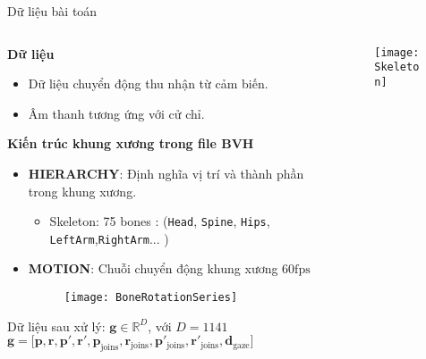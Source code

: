 \begin{frame}{Dữ liệu bài toán}
	
	
	\begin{columns}
		
		\begin{column}{0.7\textwidth}
			
			\textbf{Dữ liệu}
			\begin{itemize}
				\item Dữ liệu chuyển động thu nhận từ cảm biến.
				\item Âm thanh tương ứng với cử chỉ.
			\end{itemize}
			
			\textbf{Kiến trúc khung xương trong file BVH}
			\begin{itemize}
				\item \textbf{HIERARCHY}: Định nghĩa vị trí và thành phần trong khung xương.
				\begin{itemize}
					\item Skeleton: 75 bones : 
					\small{(\texttt{Head}, \texttt{Spine}, \texttt{Hips}, \texttt{LeftArm},\texttt{RightArm}... )} \\
				\end{itemize}
				\item \textbf{MOTION}: Chuỗi chuyển động khung xương $60 \text{fps}$
				\begin{figure}[h]
					\centering
					\texttt{[image: BoneRotationSeries]}
				\end{figure}
				
				
			\end{itemize}
			Dữ liệu sau xử lý: $\mathbf{g} \in \mathbb{R}^{D}$, với $D=1141$ 
			$\mathbf{g} = \Big[ \mathbf{p},  \mathbf{r},
			\mathbf{ p }',  \mathbf{r}',
			\mathbf{p}_{\text{joins}},  \mathbf{r}_{\text{joins}},
			\mathbf{p}'_{\text{joins}},  \mathbf{r}'_{\text{joins}},
			\mathbf{d}_{\text{gaze}}
			\Big]$
		
		\end{column}
		
			\begin{column}{0.3\textwidth}
				\begin{figure}[h]
					\centering
					\texttt{[image: Skeleton]}
				\end{figure}
		\end{column}
		
	\end{columns}
	
\end{frame}

